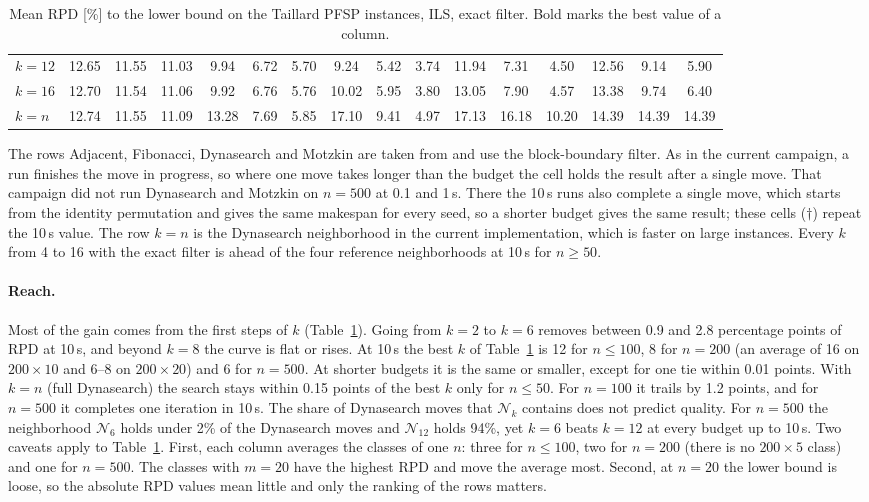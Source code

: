 \documentclass[letterpaper]{article} %
\theoremstyle{definition}
\newcommand{\N}{\mathcal{N}}
\begin{document}
\begin{table}[t]
\begin{tabular}{@{}l*{15}{c}@{}}
$k=12$ & 12.65 & 11.55 & 11.03 & 9.94 & 6.72 & 5.70 & 9.24 & 5.42 & 3.74 & 11.94 & 7.31 & 4.50 & 12.56 & 9.14 & 5.90 \\
$k=16$ & 12.70 & 11.54 & 11.06 & 9.92 & 6.76 & 5.76 & 10.02 & 5.95 & 3.80 & 13.05 & 7.90 & 4.57 & 13.38 & 9.74 & 6.40 \\
$k=n$ & 12.74 & 11.55 & 11.09 & 13.28 & 7.69 & 5.85 & 17.10 & 9.41 & 4.97 & 17.13 & 16.18 & 10.20 & 14.39 & 14.39 & 14.39 \\
\bottomrule
\end{tabular}
\caption{Mean RPD [\%] to the lower bound on the Taillard PFSP instances, ILS, exact filter. Bold marks
the best value of a column.}
\label{tab:main}
\end{table}
The rows Adjacent, Fibonacci, Dynasearch and Motzkin are taken from \citet{wojewodzki2026windowed} and use the block-boundary filter. As in the
current campaign, a run finishes the move in progress, so where one move
takes longer than the budget the cell holds the result after a single
move. That campaign did not run Dynasearch and Motzkin on $n=500$ at
0.1 and 1\,s. There the 10\,s runs also complete a single move, which
starts from the identity permutation and gives the same makespan for
every seed, so a shorter budget gives the same result; these cells
($\dagger$) repeat the 10\,s value. The
row $k=n$ is the
Dynasearch neighborhood in the current implementation, which is faster
on large instances. Every $k$ from 4 to 16 with the exact filter is ahead
of the four reference neighborhoods at 10\,s for $n\geq 50$.

\paragraph{Reach.} Most of the gain comes from the first steps of $k$
(Table~\ref{tab:main}). Going from $k=2$ to $k=6$ removes between 0.9
and 2.8 percentage points of RPD at 10\,s, and beyond $k=8$ the curve is
flat or rises. At 10\,s the best $k$ of Table~\ref{tab:main} is 12 for $n\leq 100$, 8 for $n=200$
(an average of 16 on $200\times 10$ and 6--8 on $200\times 20$) and 6 for
$n=500$. At shorter budgets it is the same or smaller, except
for one tie within 0.01 points. With $k=n$ (full Dynasearch) the search
stays within 0.15 points of the best $k$ only for $n\leq 50$. For $n=100$
it trails by 1.2 points, and for $n=500$ it completes one iteration in
10\,s. The share of Dynasearch moves that $\N_k$ contains does not
predict quality. For $n=500$ the neighborhood $\N_6$ holds under 2\% of
the Dynasearch moves and $\N_{12}$ holds 94\%, yet $k=6$ beats $k=12$ at
every budget up to 10\,s. Two caveats apply to Table~\ref{tab:main}. First,
each column averages the classes of one $n$: three for $n\leq 100$, two
for $n=200$ (there is no $200\times 5$ class) and one for $n=500$. The
classes with $m=20$ have the highest RPD and move the average most.
Second, at $n=20$ the lower bound is loose, so the absolute RPD values
mean little and only the ranking of the rows matters.
\end{document}
